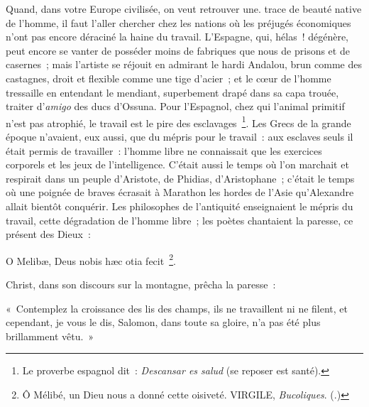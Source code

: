\documentclass[french,twoside]{book} %
\newenvironment{quoteblock}%
  {\begin{quoting}}
  {\end{quoting}}
\newenvironment{quotebar}{%
    \def\FrameCommand{{\color{rubric!10!}\vrule width 0.5em} \hspace{0.9em}}%
    \def\OuterFrameSep{\itemsep} %
    \MakeFramed {\advance\hsize-\width \FrameRestore}
  }%
  {%
    \endMakeFramed
  }
\renewenvironment{quoteblock}%
  {%
    \savenotes
    \setstretch{0.9}
    \normalfont
    \begin{quotebar}
  }
  {%
    \end{quotebar}
    \spewnotes
  }
\begin{document}
Quand, dans votre Europe civilisée, on veut retrouver une. trace de beauté native de l’homme, il faut l’aller chercher chez les nations où les préjugés économiques n’ont pas encore déraciné la haine du travail. L’Espagne, qui, hélas ! dégénère, peut encore se vanter de posséder moins de fabriques que nous de prisons et de casernes ; mais l’artiste se réjouit en admirant le hardi Andalou, brun comme des castagnes, droit et flexible comme une tige d’acier ; et le cœur de l’homme tressaille en entendant le mendiant, superbement drapé dans sa capa trouée, traiter d’\emph{amigo} des ducs d’Ossuna. Pour l’Espagnol, chez qui l’animal primitif n’est pas atrophié, le travail est le pire des esclavages \footnote{Le proverbe espagnol dit : \emph{Descansar es salud} (se reposer est santé).}. Les Grecs de la grande époque n’avaient, eux aussi, que du mépris pour le travail : aux esclaves seuls il était permis de travailler : l’homme libre ne connaissait que les exercices corporels et les jeux de l’intelligence. C’était aussi le temps où l’on marchait et respirait dans un peuple d’Aristote, de Phidias, d’Aristophane ; c’était le temps où une poignée de braves écrasait à Marathon les hordes de l’Asie qu’Alexandre allait bientôt conquérir. Les philosophes de l’antiquité enseignaient le mépris du travail, cette dégradation de l’homme libre ; les poètes chantaient la paresse, ce présent des Dieux :\par

\begin{quoteblock}
 \noindent O Melibæ, Deus nobis hæc otia fecit \footnote{Ô Mélibé, un Dieu nous a donné cette oisiveté. VIRGILE, \emph{Bucoliques}. (\hyperref[le_droit_paresse_chapitre_5]{}.)}.
\end{quoteblock}

\noindent Christ, dans son discours sur la montagne, prêcha la paresse :\par

\begin{quoteblock}
 \noindent « Contemplez la croissance des lis des champs, ils ne travaillent ni ne filent, et cependant, je vous le dis, Salomon, dans toute sa gloire, n’a pas été plus brillamment vêtu. »
\end{quoteblock}
\end{document}
